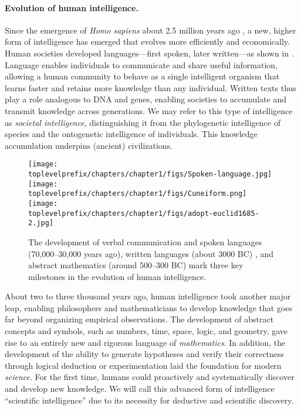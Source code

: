 \documentclass[../../book-main.tex]{subfiles}
\begin{document}
\paragraph{Evolution of human intelligence.}
Since the emergence of \textit{Homo sapiens} about 2.5 million years ago \cite{Harari-2015}, a new, higher form of intelligence has emerged that evolves more efficiently and economically. Human societies developed languages---first spoken, later written---as shown in . Language enables individuals to communicate and share useful information, allowing a human community to behave as a single intelligent organism that learns faster and retains more knowledge than any individual. Written texts thus play a role analogous to DNA and genes, enabling societies to accumulate and transmit knowledge across generations. We may refer to this type of intelligence as \textit{societal intelligence}, distinguishing it from the phylogenetic intelligence of species and the ontogenetic intelligence of individuals. This knowledge accumulation underpins (ancient) civilizations.

\begin{figure}
    \centering
    \texttt{[image: \\toplevelprefix/chapters/chapter1/figs/Spoken-language.jpg]}
   \hspace{5mm} \texttt{[image: \\toplevelprefix/chapters/chapter1/figs/Cuneiform.png]}
   \hspace{5mm} \texttt{[image: \\toplevelprefix/chapters/chapter1/figs/adopt-euclid1685-2.jpg]}
    \caption{The development of verbal communication and spoken languages (70,000--30,000 years ago), written languages (about 3000 BC) \cite{schmandt2014evolution}, and abstract mathematics (around 500--300 BC) \cite{heath1956thirteen} mark three key milestones in the evolution of human intelligence.}
    \label{fig:human-intelligence}
\end{figure}

About two to three thousand years ago, human intelligence took another major leap, enabling philosophers and mathematicians to develop knowledge that goes far beyond organizing empirical observations. The development of abstract concepts and symbols, such as numbers, time, space, logic, and geometry, gave rise to an entirely new and rigorous language of \textit{mathematics}. In addition, the development of the ability to generate hypotheses and verify their correctness through logical deduction or experimentation laid the foundation for modern \textit{science}. For the first time, humans could proactively and systematically discover and develop new knowledge. We will call this advanced form of intelligence ``scientific intelligence'' due to its necessity for deductive and scientific discovery.
\end{document}
